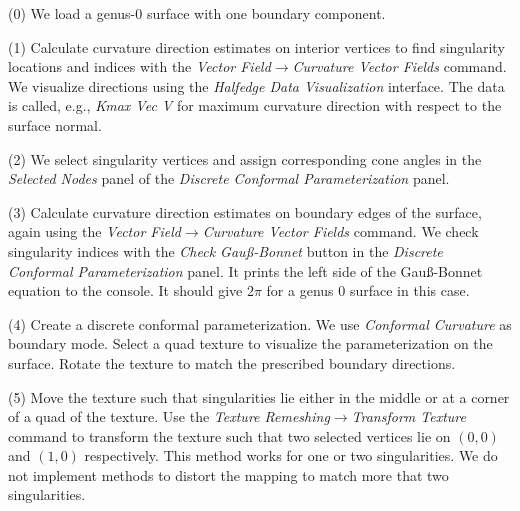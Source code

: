 \documentclass[Thesis.tex]{subfiles}
\begin{document}
\begin{compactenum}[(1)]
\item[(0)] We load a genus-$0$ surface with one boundary component.
\item[(1)] Calculate curvature direction estimates on interior vertices to find singularity locations and indices with the \emph{Vector Field$\to$Curvature Vector Fields} command. We visualize directions using the \emph{Halfedge Data Visualization} interface. The data is called, e.g., \emph{Kmax Vec V} for maximum curvature direction with respect to the surface normal.
\item[(2)] We select singularity vertices and assign corresponding cone angles in the \emph{Selected Nodes} panel of the \emph{Discrete Conformal Parameterization} panel.
\item[(3)] Calculate curvature direction estimates on boundary edges of the surface, again using the \emph{Vector Field$\to$Curvature Vector Fields} command. We check singularity indices with the \emph{Check Gau{\ss}-Bonnet} button in the \emph{Discrete Conformal Parameterization} panel. It prints the left side of the Gau{\ss}-Bonnet equation to the console. It should give $2\pi$ for a genus $0$ surface in this case.

\begin{center}
\begin{minipage}{0.9\linewidth}
            \centering
\end{minipage}
\end{center}     
            
\item[(4)] Create a discrete conformal parameterization. We use \emph{Conformal Curvature} as boundary mode. Select a quad texture to visualize the parameterization on the surface. Rotate the texture to match the prescribed boundary directions.
\item[(5)] Move the texture such that singularities lie either in the middle or at a corner of a quad of the texture. Use the \emph{Texture Remeshing$\to$Transform Texture} command to transform the texture such that two selected vertices lie on $(0,0)$ and $(1,0)$ respectively. This method works for one or two singularities. We do not implement methods to distort the mapping to match more that two singularities.


\end{compactenum}
\end{document}
